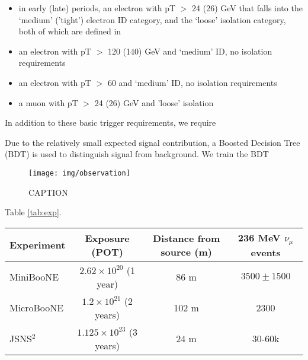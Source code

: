 \documentclass[
aps,
prl,
reprint,
showpacs,
]{revtex4-1}
\begin{document}
\begin{itemize}
    \item in early (late) periods, an electron with pT $>$ 24 (26) GeV that falls into the ‘medium’ ('tight') electron ID category, and the ‘loose’ isolation category, both of which are defined in \cite{elIDs}
    \item an electron with pT $>$ 120 (140) GeV and ‘medium’ ID, no isolation requirements
    \item an electron with pT $>$ 60 and ‘medium’ ID, no isolation requirements
    \item a muon with pT $>$ 24 (26) GeV and 'loose' isolation
\end{itemize}

In addition to these basic trigger requirements, we require 



Due to the relatively small expected signal contribution, a Boosted Decision Tree (BDT) is used to distinguish signal from background. We train the BDT 

















\begin{figure}[h]
\texttt{[image: img/observation]} 
\caption{CAPTION}
\label{fig:obs}
\end{figure}


 Table \ref{tab:exp}.

\begin{table*}
  \label{tab:exp}
  \begin{ruledtabular}
  \newcommand{\twrw}[1]{\multirow{2}{*}{#1}}
  \begin{tabular}{lccc}
  Experiment & Exposure (POT) & Distance from source (m) & 236 MeV $\nu_\mu$ events \\
    \hline
MiniBooNE & $2.62\times 10^{20}$ (1 year) & 86 m& $3500\pm1500$ \\
MicroBooNE & $1.2\times 10^{21}$ (2 years) & 102 m & 2300 \\
JSNS$^2$ & $1.125\times 10^{23}$ (3 years) & 24 m  & 30-60k \\

  \end{tabular}
  \end{ruledtabular}
    \caption{A summary of experiments that can detect KDAR neutrinos and the event rates expected.}
\end{table*}
\end{document}
